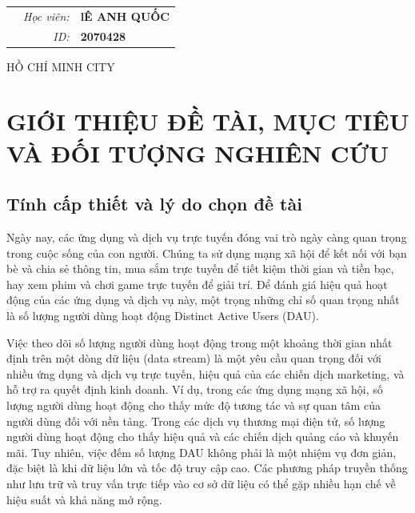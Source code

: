 \documentclass[a4paper,13pt]{article}
\theoremstyle{mytheor}
\begin{document}
\begin{titlepage}
\begin{center}
\begin{tabular}{c}
\end{tabular}
\end{center}

\vspace{1cm}

\begin{table}[h]
\begin{tabular}{rrl}
\hspace{5.6cm} 
&\textit{Học viên: } & \textbf{lÊ ANH QUỐC}\\
&\textit{ID: } & \textbf{2070428}\\

\end{tabular}
\end{table}
\vspace{1cm}
\begin{center}
{\footnotesize HỒ CHÍ MINH CITY}
\end{center}
\end{titlepage}




\renewcommand{\contentsname}{Content}
\newpage
\vspace{1cm}
\tableofcontents
\newpage
\section{GIỚI THIỆU ĐỀ TÀI, MỤC TIÊU VÀ ĐỐI TƯỢNG NGHIÊN CỨU}
\subsection{Tính cấp thiết và lý do chọn đề tài}
\hspace{2em}Ngày nay, các ứng dụng và dịch vụ trực tuyến đóng vai trò ngày càng quan trọng trong cuộc sống của con người. 
Chúng ta sử dụng mạng xã hội để kết nối với bạn bè và chia sẻ thông tin, mua sắm trực tuyến để tiết kiệm thời gian và tiền bạc, 
hay xem phim và chơi game trực tuyến để giải trí. Để đánh giá hiệu quả hoạt động của các ứng dụng và dịch vụ này, 
một trọng những chỉ số quan trọng nhất là số lượng người dùng hoạt động Distinct Active Users (DAU).

Việc theo dõi số lượng người dùng hoạt động trong một khoảng thời gian nhất định trên một dòng dữ liệu (data stream) 
là một yêu cầu quan trọng đối với nhiều ứng dụng và dịch vụ trực tuyến, hiệu quả của các chiến dịch marketing, 
và hỗ trợ ra quyết định kinh doanh. Ví dụ, trong các ứng dụng mạng xã hội, số lượng người dùng hoạt động cho thấy mức độ tương tác 
và sự quan tâm của người dùng đối với nền tảng. Trong các dịch vụ thương mại điện tử, số lượng người dùng hoạt động cho thấy hiệu quả 
và các chiến dịch quảng cáo và khuyến mãi. Tuy nhiên, việc đếm số lượng DAU không phải là một nhiệm vụ đơn giản, đặc biệt là khi dữ liệu lớn 
và tốc độ truy cập cao. Các phương pháp truyền thống như lưu trữ và truy vấn trực tiếp vào cơ sở dữ liệu có thể gặp nhiều hạn chế về hiệu suất 
và khả năng mở rộng.
\end{document}
